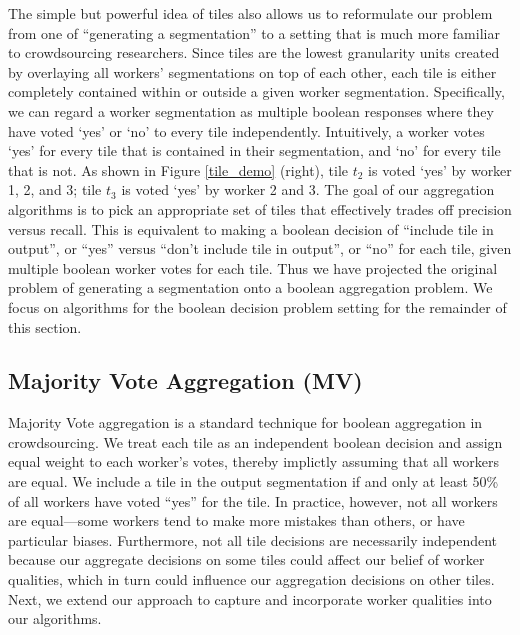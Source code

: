 \par The simple but powerful idea of tiles also allows us to reformulate our problem from one of ``generating a segmentation'' to a setting that is much more familiar to crowdsourcing researchers. Since tiles are the lowest granularity units created by overlaying all workers' segmentations on top of each other, each tile is either completely contained within or outside a given worker segmentation. Specifically, we can regard a worker segmentation as multiple boolean responses where they have voted `yes' or `no' to every tile independently. Intuitively, a worker votes `yes' for every tile that is contained in their segmentation, and `no' for every tile that is not. As shown in Figure \ref{tile_demo} (right), tile $t_2$ is voted `yes' by worker 1, 2, and 3; tile $t_3$ is voted `yes' by worker 2 and 3. The goal of our aggregation algorithms is to pick an appropriate set of tiles that effectively trades off precision versus recall. This is equivalent to making a boolean decision of ``include tile in output'', or ``yes'' versus ``don't include tile in output'', or ``no'' for each tile, given multiple boolean worker votes for each tile.
Thus we have projected the original problem of generating a segmentation onto a boolean aggregation problem. We focus on algorithms for the boolean decision problem setting for the remainder of this section.

\subsection{Majority Vote Aggregation (MV)} 
\par \noindent Majority Vote aggregation is a standard technique for boolean aggregation in crowdsourcing. We treat each tile as an independent boolean decision and assign equal weight to each worker's votes, thereby implictly assuming that all workers are equal. We include a tile in the output segmentation if and only at least 50\% of all workers have voted ``yes'' for the tile. In practice, however, not all workers are equal---some workers tend to make more mistakes than others, or have particular biases. Furthermore, not all tile decisions are necessarily independent because our aggregate decisions on some tiles could affect our belief of worker qualities, which in turn could influence our aggregation decisions on other tiles. Next, we extend our approach to capture and incorporate worker qualities into our algorithms.

